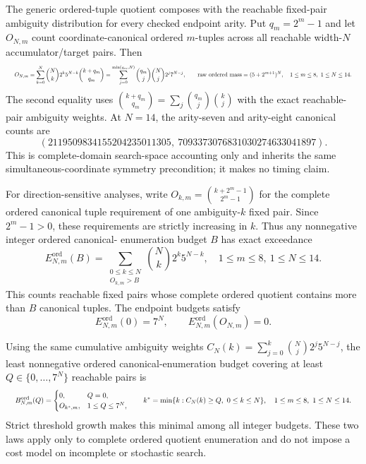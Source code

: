 \documentclass{article}
\newcommand{\fitmath}[1]{\resizebox{0.99\linewidth}{!}{$\displaystyle #1$}}
\begin{document}
The generic ordered-tuple quotient composes with the reachable fixed-pair
ambiguity distribution for every checked endpoint arity. Put $q_m=2^m-1$ and
let $O_{N,m}$ count coordinate-canonical ordered $m$-tuples across all reachable
width-$N$ accumulator/target pairs. Then
\begin{equation}
  \fitmath{%
    O_{N,m}
      =\sum_{k=0}^{N}\binom{N}{k}2^k5^{N-k}\binom{k+q_m}{q_m}
      =\sum_{j=0}^{\min(q_m,N)}
        \binom{q_m}{j}\binom{N}{j}2^j7^{N-j},
    \qquad
    \text{raw ordered mass}=(5+2^{m+1})^N,
    \quad 1\leq m\leq8,\ 1\leq N\leq14.
  }
  \label{eq:optimization-crazy-global-ordered-preimage-tuple-quotient}
\end{equation}
The second equality uses
$\binom{k+q_m}{q_m}=\sum_j\binom{q_m}{j}\binom{k}{j}$ with the exact
reachable-pair ambiguity weights. At $N=14$, the arity-seven and arity-eight
canonical counts are
\begin{equation*}
  (2119509834155204235011305,\ 7093373076831030274633041897).
\end{equation*}
This is complete-domain search-space accounting only and inherits the same
simultaneous-coordinate symmetry precondition; it makes no timing claim.

For direction-sensitive analyses, write
$O_{k,m}=\binom{k+2^m-1}{2^m-1}$ for the complete ordered canonical tuple
requirement of one ambiguity-$k$ fixed pair. Since $2^m-1>0$, these requirements
are strictly increasing in $k$. Thus any nonnegative integer ordered canonical-
enumeration budget $B$ has exact exceedance
\begin{equation}
  E^{\mathrm{ord}}_{N,m}(B)
    =\sum_{\substack{0\leq k\leq N\\ O_{k,m}>B}}
      \binom{N}{k}2^k5^{N-k},
  \quad 1\leq m\leq8,\ 1\leq N\leq14.
  \label{eq:optimization-crazy-profile-ordered-tuple-budget-exceedance}
\end{equation}
This counts reachable fixed pairs whose complete ordered quotient contains more
than $B$ canonical tuples. The endpoint budgets satisfy
\[
  E^{\mathrm{ord}}_{N,m}(0)=7^N,
  \qquad E^{\mathrm{ord}}_{N,m}(O_{N,m})=0.
\]

Using the same cumulative ambiguity weights
$C_N(k)=\sum_{j=0}^{k}\binom{N}{j}2^j5^{N-j}$, the least nonnegative ordered
canonical-enumeration budget covering at least
$Q\in\{0,\ldots,7^N\}$ reachable pairs is
\begin{equation}
  \fitmath{%
    B^{\mathrm{ord}}_{N,m}(Q)=\begin{cases}
      0,&Q=0,\\
      O_{k^*,m},&1\leq Q\leq7^N,
    \end{cases}
    \qquad
    k^*=\min\{k:C_N(k)\geq Q,\ 0\leq k\leq N\},
    \quad 1\leq m\leq8,\ 1\leq N\leq14.
  }
  \label{eq:optimization-crazy-profile-ordered-tuple-minimum-coverage-budget}
\end{equation}
Strict threshold growth makes this minimal among all integer budgets. These two
laws apply only to complete ordered quotient enumeration and do not impose a
cost model on incomplete or stochastic search.
\end{document}
